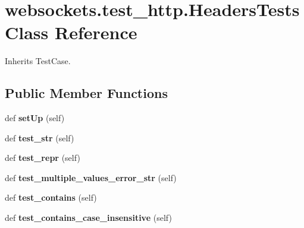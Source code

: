 \hypertarget{classwebsockets_1_1test__http_1_1_headers_tests}{}\section{websockets.\+test\+\_\+http.\+Headers\+Tests Class Reference}
\label{classwebsockets_1_1test__http_1_1_headers_tests}


Inherits Test\+Case.

\subsection*{Public Member Functions}
\begin{DoxyCompactItemize}
\item 
\mbox{\label{classwebsockets_1_1test__http_1_1_headers_tests_a68ee6f10773da70e0f839e99062aff99}} 
def {\bfseries set\+Up} (self)
\item 
\mbox{\label{classwebsockets_1_1test__http_1_1_headers_tests_a49cd740ccf8e576f354bab24b609f914}} 
def {\bfseries test\+\_\+str} (self)
\item 
\mbox{\label{classwebsockets_1_1test__http_1_1_headers_tests_abda7c4c48be6928af16830f3ff1f821c}} 
def {\bfseries test\+\_\+repr} (self)
\item 
\mbox{\label{classwebsockets_1_1test__http_1_1_headers_tests_ad6840291ca2762570fe7ddc2103aa596}} 
def {\bfseries test\+\_\+multiple\+\_\+values\+\_\+error\+\_\+str} (self)
\item 
\mbox{\label{classwebsockets_1_1test__http_1_1_headers_tests_ad8419aa42eaceca0b0e7b89f1121c003}} 
def {\bfseries test\+\_\+contains} (self)
\item 
\mbox{\label{classwebsockets_1_1test__http_1_1_headers_tests_a5324d77a8d44ea4dab78a3942358e514}} 
def {\bfseries test\+\_\+contains\+\_\+case\+\_\+insensitive} (self)
\item 
\mbox{\label{classwebsockets_1_1test__http_1_1_headers_tests_adb083a1c0c29611e581a584722d668ca}} 

\end{DoxyCompactItemize}
